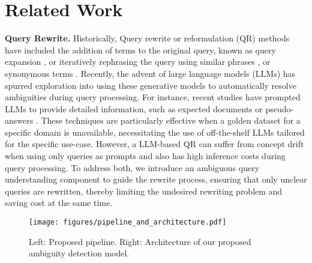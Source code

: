 \section{Related Work}
\textbf{Query Rewrite.} 
Historically, Query rewrite or reformulation (QR) methods have included the addition of terms to the original query, known as query expansion \cite{lavrenko2017relevance}, or iteratively rephrasing the query using similar phrases \cite{zukerman2002lexical}, or synonymous terms \cite{jones2006generating}. 
Recently, the advent of large language models (LLMs) has spurred exploration into using these generative models to automatically resolve ambiguities during query processing.
For instance, recent studies have prompted LLMs to provide detailed information, such as expected documents or pseudo-answers \cite{wang2023query2doc, jagerman2023query}. These techniques are particularly effective when a golden dataset for a specific domain is unavailable, necessitating the use of off-the-shelf LLMs tailored for the specific use-case.
However, a
LLM-based QR can suffer from concept drift when using only queries as prompts \cite{anand2023context} and also has high inference costs during query processing. 
To address both, we introduce an ambiguous query understanding component to guide the rewrite process, ensuring that only unclear queries are rewritten, thereby limiting the undesired rewriting problem and saving cost at the same time. 

\begin{figure*}[htbp]
    \centering
    \texttt{[image: figures/pipeline\_and\_architecture.pdf]} %
    \caption{Left: Proposed pipeline. Right: Architecture of our proposed ambiguity detection model.}
    \label{fig:pipline_and_architecture}
    \vspace{-0.5cm}
\end{figure*}

